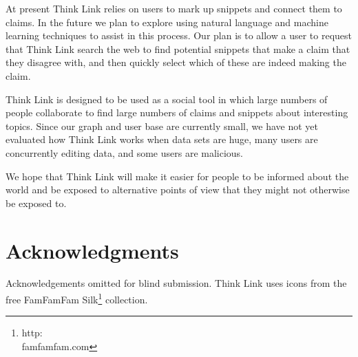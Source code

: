 \documentclass{chi2009}
\newcommand{\todo}[1]{}
\begin{document}
At present Think Link relies on users to mark up snippets and connect them to claims. In the future we plan to explore using natural language and machine learning techniques to assist in this process. Our plan is to allow a user to request that Think Link search the web to find potential snippets that make a claim that they disagree with, and then quickly select which of these are indeed making the claim.

Think Link is designed to be used as a social tool in which large numbers of people collaborate to find large numbers of claims and snippets about interesting topics. Since our graph and user base are currently small, we have not yet evaluated how Think Link works when data sets are huge, many users are concurrently editing data, and some users are malicious.

We hope that Think Link will make it easier for people to be informed about the world and be exposed to alternative points of view that they might not otherwise be exposed to.

\section{Acknowledgments}

Acknowledgements omitted for blind submission. Think Link uses icons from the free FamFamFam Silk\footnote{http:\\famfamfam.com} collection.


\todo{Sort out bad references}

\end{document}
